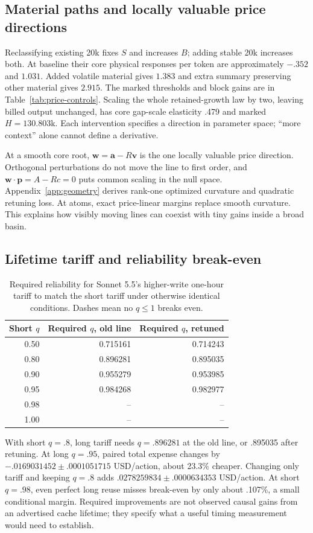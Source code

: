 \documentclass[sigconf,screen,nonacm]{acmart}
\makeatletter
\newcommand{\pp}{\boldsymbol{p}}
\newcommand{\PaperTariffBreakEven}{%
\begin{tabular}{@{}rrr@{}}\toprule
Short $q$ & Required $q$, old line & Required $q$, retuned\\\midrule
0.50 & 0.715161 & 0.714243\\
0.80 & 0.896281 & 0.895035\\
0.90 & 0.955279 & 0.953985\\
0.95 & 0.984268 & 0.982977\\
0.98 & -- & --\\
1.00 & -- & --\\\bottomrule
\end{tabular}}
\makeatother
\begin{document}
\subsection{Material paths and locally valuable price directions}
Reclassifying existing 20k fixes $S$ and increases $B$; adding stable
20k increases both. At baseline their core physical responses per token
are approximately $-.352$ and $1.031$. Added volatile material gives
$1.383$ and extra summary preserving other material gives $2.915$.
The marked thresholds and block gains are in Table~\ref{tab:price-controls}.
Scaling the whole retained-growth law by two, leaving billed output
unchanged, has core gap-scale elasticity .479 and marked $H=130.803$k.
Each intervention specifies a direction in parameter space; ``more
context'' alone cannot define a derivative.

At a smooth core root, $\boldsymbol w=\boldsymbol a-R\boldsymbol v$
is the one locally valuable price direction. Orthogonal perturbations
do not move the line to first order, and
$\boldsymbol w\cdot\pp=A-Rc=0$ puts common scaling in the null space.
Appendix~\ref{app:geometry} derives rank-one optimized curvature and
quadratic retuning loss. At atoms, exact price-linear margins replace
smooth curvature. This explains how visibly moving lines can coexist
with tiny gains inside a broad basin.

\subsection{Lifetime tariff and reliability break-even}
\begin{table}[ht]
\centering\footnotesize\setlength{\tabcolsep}{3pt}
\caption{Required reliability for Sonnet 5.5's higher-write one-hour
tariff to match the short tariff under otherwise identical conditions.
Dashes mean no $q\le1$ breaks even.}
\label{tab:lifetime-break-even}\PaperTariffBreakEven
\end{table}

With short $q=.8$, long tariff needs $q=.896281$ at the old line, or
.895035 after retuning. At long $q=.95$, paired total expense changes
by $-.0169031452\pm.0001051715$ USD/action, about 23.3\% cheaper.
Changing only tariff and keeping $q=.8$ adds
$ .0278259834\pm.0000634353$ USD/action. At short $q=.98$, even
perfect long reuse misses break-even by only about .107\%, a small
conditional margin. Required improvements are not observed causal gains
from an advertised cache lifetime; they specify what a useful timing
measurement would need to establish.
\end{document}
